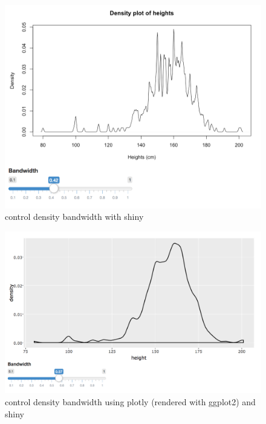 \documentclass[11pt,]{report}
\begin{document}
\begin{figure}[H]

{\centering \includegraphics[width=500px,]{./fig/shiny-density} 

}

\caption{\label{fig:d3} control density bandwidth with shiny}\label{fig:unnamed-chunk-94}
\end{figure}

\begin{figure}[H]

{\centering \includegraphics[width=17.17in,]{./fig/ggplotly-density} 

}

\caption{\label{fig:d4} control density bandwidth using plotly (rendered with ggplot2) and shiny}\label{fig:unnamed-chunk-95}
\end{figure}
\end{document}
